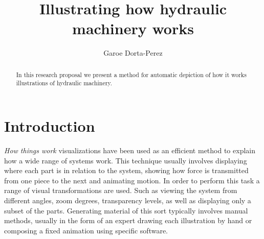 \documentclass[11pt]{report}
\title{ Illustrating how hydraulic machinery works } \author{Garoe Dorta-Perez}
\begin{document}
\maketitle
\begin{abstract}
In this research proposal we present a method for automatic depiction of how it works illustrations of hydraulic machinery. \end{abstract}


\chapter{Introduction}
\label{ch:intro}

\textit{How things work} visualizations have been used as an efficient method to explain how a wide range of systems work.
This technique usually involves displaying where each part is in relation to the system, showing how force is transmitted from one piece to the next and animating motion. 
In order to perform this task a range of visual transformations are used.
Such as viewing the system from different angles, zoom degrees,  transparency levels, as well as displaying only a subset of the parts.
Generating material of this sort typically involves manual methods, usually in the form of an expert drawing each illustration by hand or composing a fixed animation using specific software.\\
\end{document}
